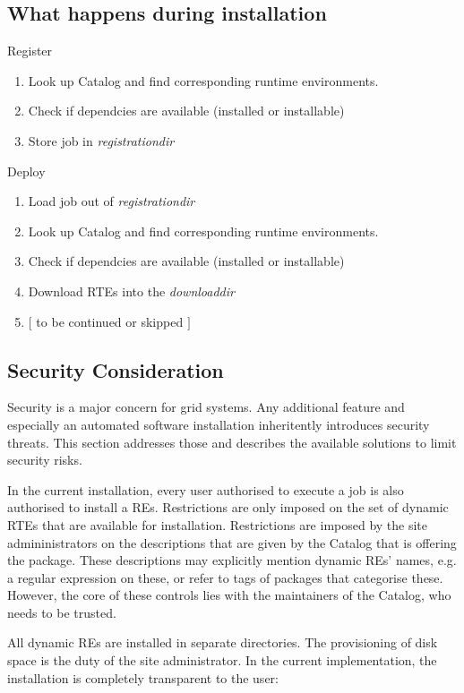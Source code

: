 \subsection{What happens during installation}

Register
\begin{enumerate}
 \item Look up Catalog and find corresponding runtime environments.
 \item Check if dependcies are available (installed or installable)
 \item Store job in \textit{registrationdir}
\end{enumerate}

Deploy
\begin{enumerate}
 \item Load job out of \textit{registrationdir}
 \item Look up Catalog and find corresponding runtime environments.
 \item Check if dependcies are available (installed or installable)
 \item Download RTEs into the \textit{downloaddir}
 \item $\lbrack$ to be continued or skipped $\rbrack$
\end{enumerate}

\subsection{Security Consideration}

Security is a major concern for grid systems. Any additional feature
and especially an automated software
installation inheritently introduces security threats. This section
addresses those and describes the available solutions to limit
security risks.

In the current installation, every user authorised to execute a job is
also authorised to install a REs. Restrictions are
only imposed on the set of dynamic RTEs that are available for installation.
Restrictions are imposed by the site admininistrators on the descriptions
that are given by the Catalog that is offering the package. These
descriptions may explicitly mention dynamic REs' names, e.g. a regular expression on
these, or refer to tags of packages that categorise these. However,
the core of these controls lies with the maintainers of the Catalog,
who needs to be trusted.

All dynamic REs are installed in separate directories. The provisioning of
disk space is the duty of the site administrator.  In the current
implementation, the installation is completely transparent to the user:

